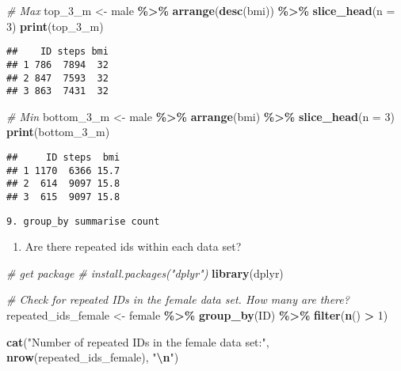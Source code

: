 \documentclass[
]{book}
\newenvironment{Shaded}{\begin{snugshade}}{\end{snugshade}}
\newcommand{\AttributeTok}[1]{\textcolor[rgb]{0.13,0.29,0.53}{#1}}
\newcommand{\CommentTok}[1]{\textcolor[rgb]{0.56,0.35,0.01}{\textit{#1}}}
\newcommand{\DecValTok}[1]{\textcolor[rgb]{0.00,0.00,0.81}{#1}}
\newcommand{\FunctionTok}[1]{\textcolor[rgb]{0.13,0.29,0.53}{\textbf{#1}}}
\newcommand{\NormalTok}[1]{#1}
\newcommand{\OtherTok}[1]{\textcolor[rgb]{0.56,0.35,0.01}{#1}}
\newcommand{\SpecialCharTok}[1]{\textcolor[rgb]{0.81,0.36,0.00}{\textbf{#1}}}
\newcommand{\StringTok}[1]{\textcolor[rgb]{0.31,0.60,0.02}{#1}}
\providecommand{\tightlist}{%
  \setlength{\itemsep}{0pt}\setlength{\parskip}{0pt}}
\begin{document}
\begin{Shaded}
\begin{Highlighting}[]
\CommentTok{\# Max}
\NormalTok{top\_3\_m }\OtherTok{\textless{}{-}}\NormalTok{ male }\SpecialCharTok{\%\textgreater{}\%}
  \FunctionTok{arrange}\NormalTok{(}\FunctionTok{desc}\NormalTok{(bmi)) }\SpecialCharTok{\%\textgreater{}\%}
  \FunctionTok{slice\_head}\NormalTok{(}\AttributeTok{n =} \DecValTok{3}\NormalTok{)}
\FunctionTok{print}\NormalTok{(top\_3\_m)}
\end{Highlighting}
\end{Shaded}

\begin{verbatim}
##    ID steps bmi
## 1 786  7894  32
## 2 847  7593  32
## 3 863  7431  32
\end{verbatim}

\begin{Shaded}
\begin{Highlighting}[]
\CommentTok{\# Min  }
\NormalTok{bottom\_3\_m }\OtherTok{\textless{}{-}}\NormalTok{ male }\SpecialCharTok{\%\textgreater{}\%}
  \FunctionTok{arrange}\NormalTok{(bmi) }\SpecialCharTok{\%\textgreater{}\%}
  \FunctionTok{slice\_head}\NormalTok{(}\AttributeTok{n =} \DecValTok{3}\NormalTok{)}
\FunctionTok{print}\NormalTok{(bottom\_3\_m)}
\end{Highlighting}
\end{Shaded}

\begin{verbatim}
##     ID steps  bmi
## 1 1170  6366 15.7
## 2  614  9097 15.8
## 3  615  9097 15.8
\end{verbatim}

\begin{verbatim}
9. group_by summarise count
\end{verbatim}

\begin{enumerate}
\def\labelenumi{\arabic{enumi}.}
\setcounter{enumi}{1}
\tightlist
\item
  Are there repeated ids within each data set?
\end{enumerate}

\begin{Shaded}
\begin{Highlighting}[]
\CommentTok{\# get package}
\CommentTok{\# install.packages("dplyr")}
\FunctionTok{library}\NormalTok{(dplyr)}


\CommentTok{\# Check for repeated IDs in the female data set. How many are there?}
\NormalTok{repeated\_ids\_female }\OtherTok{\textless{}{-}}\NormalTok{ female }\SpecialCharTok{\%\textgreater{}\%}
  \FunctionTok{group\_by}\NormalTok{(ID) }\SpecialCharTok{\%\textgreater{}\%}
  \FunctionTok{filter}\NormalTok{(}\FunctionTok{n}\NormalTok{() }\SpecialCharTok{\textgreater{}} \DecValTok{1}\NormalTok{)}

\FunctionTok{cat}\NormalTok{(}\StringTok{"Number of repeated IDs in the female data set:"}\NormalTok{, }\FunctionTok{nrow}\NormalTok{(repeated\_ids\_female), }\StringTok{"}\SpecialCharTok{\textbackslash{}n}\StringTok{"}\NormalTok{)}
\end{Highlighting}
\end{Shaded}
\end{document}
